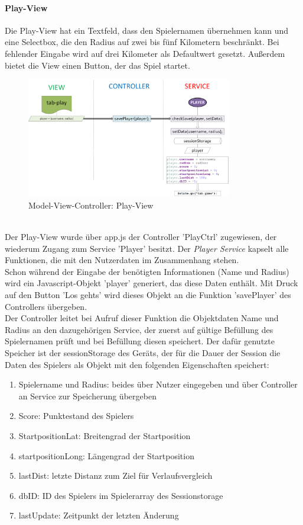 \paragraph{Play-View}
%
Die Play-View hat ein Textfeld, dass den Spielernamen übernehmen kann und eine Selectbox, die den Radius auf zwei bis fünf Kilometern beschränkt. Bei fehlender Eingabe wird auf drei Kilometer als Defaultwert gesetzt. Außerdem bietet die View einen Button, der das Spiel startet. 
%
\begin{figure}[h]
\centering
\includegraphics[width=0.8\textwidth]{ref/images/02-play-tab.png}
\caption[Model-View-Controller: Play-View]{Model-View-Controller: Play-View}
\label{fig:MVC:Play-View}
\end{figure}
\\
%
Der Play-View wurde über app.js der Controller 'PlayCtrl' zugewiesen, der wiederum Zugang zum Service 'Player' besitzt. Der \emph{Player Service} kapselt alle Funktionen, die mit den Nutzerdaten im Zusammenhang stehen.
\\
Schon während der Eingabe der benötigten Informationen (Name und Radius) wird ein Javascript-Objekt 'player' generiert, das diese Daten enthält. Mit Druck auf den Button 'Los gehts' wird dieses Objekt an die Funktion 'savePlayer' des Controllers übergeben. 
\\
Der Controller leitet bei Aufruf dieser Funktion die Objektdaten Name und Radius an den dazugehörigen Service, der zuerst auf gültige Befüllung des Spielernamen prüft und bei Befüllung diesen speichert. Der dafür genutzte Speicher ist der sessionStorage des Geräts, der für die Dauer der Session die Daten des Spielers als Objekt mit den folgenden Eigenschaften speichert: 
\begin{enumerate}
\item Spielername und Radius: beides über Nutzer eingegeben und über Controller an Service zur Speicherung übergeben
\item Score: Punktestand des Spielers
\item StartpositionLat: Breitengrad der Startposition
\item startpositionLong: Längengrad der Startposition
\item lastDist: letzte Distanz zum Ziel für Verlaufsvergleich
\item dbID: ID des Spielers im Spielerarray des Sessionstorage
\item lastUpdate: Zeitpunkt der letzten Änderung
\end{enumerate}
